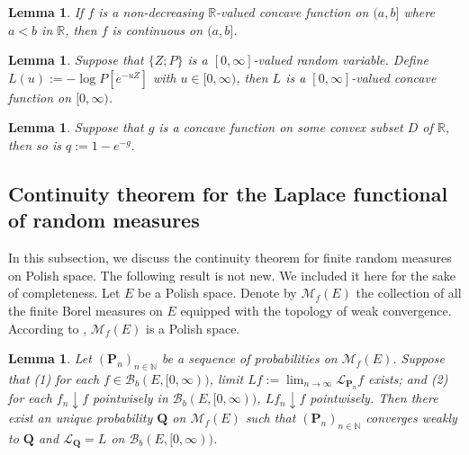 \documentclass[12pt,a4paper]{amsart}
\numberwithin{equation}{section}
\theoremstyle{plain}
\newtheorem{lem}[thm]{Lemma}
\theoremstyle{definition}
\theoremstyle{remark}
\begin{document}
\begin{lem} \label{Fact:CR!}
	If $f$ is a non-decreasing $\mathbb R$-valued concave function on $(a,b]$ where $a<b$ in $\mathbb R$, then $f$ is continuous on $(a,b]$.
\end{lem}


\begin{lem} \label{Fact:CP!}
	Suppose that $\{Z; P\}$ is a $[0,\infty]$-valued random variable.
	Define $L(u):= - \log P[e^{- u Z}]$ with $u \in [0,\infty)$, then $L$ is a $[0,\infty]$-valued concave function on $[0,\infty)$.
\end{lem}

\begin{lem} \label{lem:CE}
	Suppose that $g$ is a concave function on some convex subset $D$ of $\mathbb R$, then so is $q:= 1- e^{-g}.$
\end{lem}

\subsection{Continuity theorem for the Laplace functional of random measures}
	In this subsection, we discuss the continuity theorem for finite random measures on Polish space.	
	The following result is not new.
	We included it here for the sake of completeness.
	Let $E$ be a Polish space.
	Denote by $\mathcal M_f(E)$ the collection of all the finite Borel measures on $E$ equipped with the topology of weak convergence.
	According to \cite[Lemma 4.5]{Kallenberg2017Random}, $\mathcal M_f(E)$ is a Polish space.
\begin{lem} \label{fact:WC}
	Let $(\mathbf P_n)_{n\in \mathbb N}$ be a sequence of probabilities on $\mathcal M_f(E)$.
	Suppose that
	(1) for each $f \in \mathcal B_b(E,[0,\infty))$, limit $Lf := \lim_{n\to \infty}\mathscr L_{\mathbf P_n}f$ exists; and
	(2) for each $f_n \downarrow f$ pointwisely in $\mathcal B_b(E,[0,\infty))$, $Lf_n \downarrow f$ pointwisely.
	Then there exist an unique probability $\mathbf Q$ on $\mathcal M_f(E)$
	such that $(\mathbf P_n)_{n \in \mathbb N}$ converges weakly
to $\mathbf Q$ and  $\mathscr L_\mathbf Q = L$ on $\mathcal B_b(E, [0,\infty))$.
\end{lem}
\end{document}
